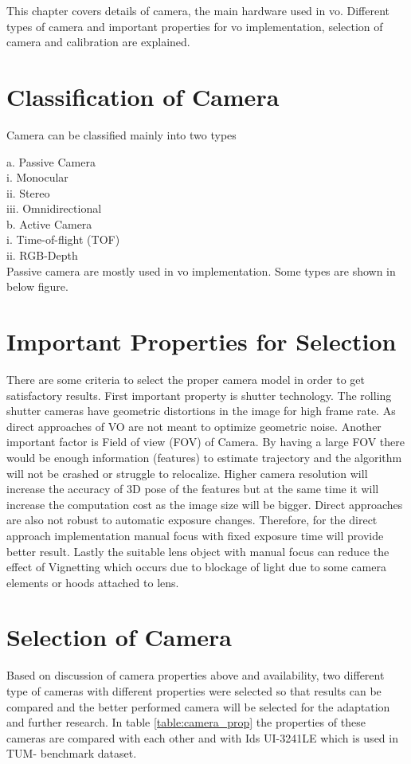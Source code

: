 This chapter covers details of camera, the main hardware used in \acrshort{vo}. Different types of camera and important properties for \acrshort{vo} implementation, selection of camera and calibration are explained. 

\section{Classification of Camera}
Camera can be classified mainly into two types

a. Passive Camera \\
  i. Monocular \\
  ii. Stereo \\
  iii. Omnidirectional \\
  
b. Active Camera \\
  i.  Time-of-flight (TOF) \\
  ii. RGB-Depth \\

Passive camera are mostly used in \acrshort{vo} implementation. Some types are shown in below figure. 

\section{Important Properties for Selection}
There are some criteria to select the proper camera model in order to get satisfactory
results. First important property is shutter technology. The rolling shutter cameras have
geometric distortions in the image for high frame rate. As direct approaches of VO are not
meant to optimize geometric noise. Another important factor is Field of view (FOV) of
Camera. By having a large FOV there would be enough information (features) to estimate
trajectory and the algorithm will not be crashed or struggle to relocalize. Higher camera
resolution will increase the accuracy of 3D pose of the features but at the same time it will
increase the computation cost as the image size will be bigger. Direct approaches are also
not robust to automatic exposure changes. Therefore, for the direct approach
implementation manual focus with fixed exposure time will provide better result. Lastly the
suitable lens object with manual focus can reduce the effect of Vignetting which occurs due
to blockage of light due to some camera elements or hoods attached to lens.

\section{Selection of Camera}
Based on discussion of camera properties above and availability, two different type of
cameras with different properties were selected so that results can be compared and the
better performed camera will be selected for the adaptation and further research. In table \ref{table:camera_prop} the properties of these cameras are compared with each other and with Ids UI-3241LE which is used in TUM- benchmark dataset.


